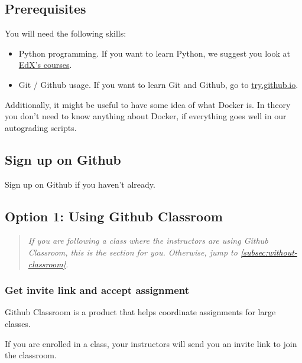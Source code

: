 

\subsection{Prerequisites}

You will need the following skills:

\begin{itemize}
    \item Python programming.
          If you want to learn Python, we suggest you look at
          \href{https://www.edx.org/learn/python}{EdX's courses}.
    \item Git / Github usage.
          If you want to learn Git and Github, go to \href{https://try.github.io/}{try.github.io}.
\end{itemize}

Additionally, it might be useful to have some idea of what Docker is.
In theory you don't need to know anything about Docker, if everything goes well in our autograding scripts.

\subsection{Sign up on Github}

Sign up on Github if you haven't already.

\subsection{Option 1: Using Github Classroom}\label{subsec:with-classroom}

\begin{quote}
    \emph{
        If you are following a class where the instructors are using Github Classroom,
        this is the section for you.
        Otherwise, jump to \cref{subsec:without-classroom}.
    }
\end{quote}

\subsubsection{Get invite link and accept assignment}
Github Classroom is a product that helps coordinate assignments for large classes.
%

If you are enrolled in a class, your instructors will send you an invite link to join the classroom.

